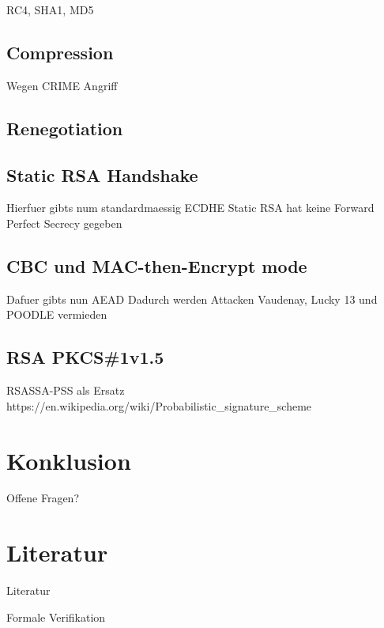 \documentclass{f4_beamer_metropolis}
\begin{document}
\begin{frame}
RC4, SHA1, MD5
\end{frame}

\subsection{Compression}

\begin{frame}
Wegen CRIME Angriff
\end{frame}

\subsection{Renegotiation}

\begin{frame}

\end{frame}

\subsection{Static RSA Handshake}

\begin{frame}
Hierfuer gibts num standardmaessig ECDHE
Static RSA hat keine Forward Perfect Secrecy gegeben
\end{frame}

\subsection{CBC und MAC-then-Encrypt mode}

\begin{frame}
Dafuer gibts nun AEAD
Dadurch werden Attacken Vaudenay, Lucky 13 und POODLE vermieden
\end{frame}

\subsection{RSA PKCS\#1v1.5}

\begin{frame}
  RSASSA-PSS als Ersatz
  https://en.wikipedia.org/wiki/Probabilistic_signature_scheme
\end{frame}

\section{Konklusion}

\begin{frame}

\end{frame}

\begin{frame}[standout]
  Offene Fragen?
\end{frame}

\section{Literatur}

\begin{frame}[allowframebreaks]{Literatur}
  \printbibliography
\end{frame}

\appendix

\begin{frame}{Formale Verifikation}

\end{frame}
\end{document}
